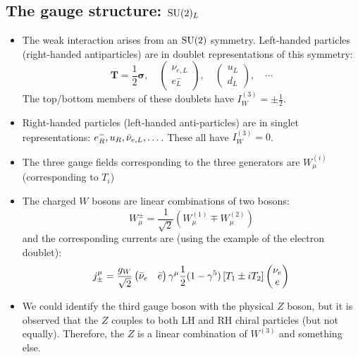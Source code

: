 \subsection{The gauge structure: $\operatorname{SU}(2)_L$}
\begin{itemize}
  \item The weak interaction arises from an $\operatorname{SU}(2)$ symmetry. Left-handed particles (right-handed antiparticles) are in doublet representations of this symmetry:
  \begin{equation}
    \mathbf{T} = \frac{1}{2}\bm\sigma, \quad \begin{pmatrix} \nu_{e,L} \\ e^-_L \end{pmatrix}, \quad \begin{pmatrix} u_{L} \\ d_L \end{pmatrix}, \quad \cdots
  \end{equation}
  The top/bottom members of these doublets have $I_W^{(3)} = \pm \frac{1}{2}$. 
  \item Right-handed particles (left-handed anti-particles) are in singlet representations: $e^{-}_R, u_R, {\bar{\nu}}_{e,L},\dots$. These all have $I_W^{(3)} = 0$. 
  \item The three gauge fields corresponding to the three generators are $W_\mu^{(i)}$ (corresponding to $T_i$)
  \item The charged $W$ bosons are linear combinations of two bosons:
  \begin{equation}
    W_\mu^\pm = \frac{1}{\sqrt2} \left(W_\mu ^{(1)} \mp W_\mu ^{(2)}\right)
  \end{equation}
  and the corresponding currents are (using the example of the electron doublet):
  \begin{equation}
    j_\pm ^\mu = \frac{g_W}{\sqrt2} \begin{pmatrix} {\bar{\nu}}_e & \bar e \end{pmatrix} \gamma^\mu \frac{1}{2} (1-\gamma^5) \left[T_1\pm iT_2\right] \begin{pmatrix} \nu_e \\ e \end{pmatrix}
  \end{equation}
  \item We could identify the third gauge boson with the physical $Z$ boson, but it is observed that the $Z$ couples to both LH and RH chiral particles (but not equally). Therefore, the $Z$ is a linear combination of $W^{(3)}$ and something else. 
\end{itemize}

